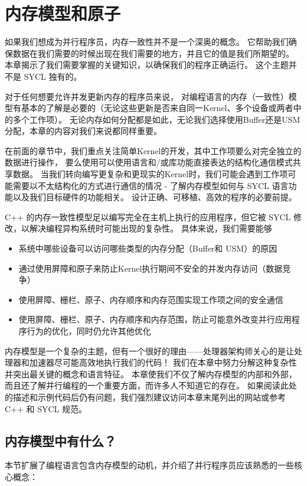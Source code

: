 \section{内存模型和原子}
如果我们想成为并行程序员，内存一致性并不是一个深奥的概念。 
它帮助我们确保数据在我们需要的时候出现在我们需要的地方，并且它的值是我们所期望的。 
本章揭示了我们需要掌握的关键知识，以确保我们的程序正确运行。 这个主题并不是 SYCL 独有的。

对于任何想要允许并发更新内存的程序员来说，
对编程语言的内存（一致性）模型有基本的了解是必要的（无论这些更新是否来自同一Kernel、多个设备或两者中的多个工作项）。 
无论内存如何分配都是如此，无论我们选择使用Buffer还是USM分配，本章的内容对我们来说都同样重要。

在前面的章节中，我们重点关注简单Kernel的开发，其中工作项要么对完全独立的数据进行操作，
要么使用可以使用语言和/或库功能直接表达的结构化通信模式共享数据。 
当我们转向编写更复杂和更现实的Kernel时，我们可能会遇到工作项可能需要以不太结构化的方式进行通信的情况 - 
了解内存模型如何与 SYCL 语言功能以及我们目标硬件的功能相关。 设计正确、可移植、高效的程序的必要前提。

C++ 的内存一致性模型足以编写完全在主机上执行的应用程序，但它被 SYCL 修改，以解决编程异构系统时可能出现的复杂性。 
具体来说，我们需要能够

\begin{itemize}
	\item 系统中哪些设备可以访问哪些类型的内存分配（Buffer和 USM）的原因

	\item 通过使用屏障和原子来防止Kernel执行期间不安全的并发内存访问（数据竞争）

	\item 使用屏障、栅栏、原子、内存顺序和内存范围实现工作项之间的安全通信

	\item 使用屏障、栅栏、原子、内存顺序和内存范围，防止可能意外改变并行应用程序行为的优化，同时仍允许其他优化
\end{itemize}

内存模型是一个复杂的主题，但有一个很好的理由——处理器架构师关心的是让处理器和加速器尽可能高效地执行我们的代码！ 
我们在本章中努力分解这种复杂性并突出最关键的概念和语言特征。 
本章使我们不仅了解内存模型的内部和外部，而且还了解并行编程的一个重要方面，而许多人不知道它的存在。 
如果阅读此处的描述和示例代码后仍有问题，我们强烈建议访问本章末尾列出的网站或参考 C++ 和 SYCL 规范。

\subsection{内存模型中有什么？}
本节扩展了编程语言包含内存模型的动机，并介绍了并行程序员应该熟悉的一些核心概念：

